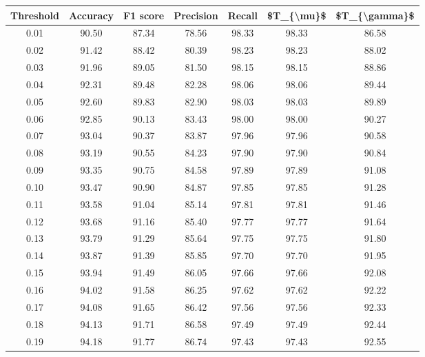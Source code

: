 \begin{tabular}{|c|c|c|c|c|c|c|}
\hline
 Threshold &  Accuracy &  F1 score &  Precision &  Recall &  \$T\_\{\textbackslash mu\}\$ &  \$T\_\{\textbackslash gamma\}\$ \\
\hline
      0.01 &     90.50 &     87.34 &      78.56 &   98.33 &      98.33 &         86.58 \\
      0.02 &     91.42 &     88.42 &      80.39 &   98.23 &      98.23 &         88.02 \\
      0.03 &     91.96 &     89.05 &      81.50 &   98.15 &      98.15 &         88.86 \\
      0.04 &     92.31 &     89.48 &      82.28 &   98.06 &      98.06 &         89.44 \\
      0.05 &     92.60 &     89.83 &      82.90 &   98.03 &      98.03 &         89.89 \\
      0.06 &     92.85 &     90.13 &      83.43 &   98.00 &      98.00 &         90.27 \\
      0.07 &     93.04 &     90.37 &      83.87 &   97.96 &      97.96 &         90.58 \\
      0.08 &     93.19 &     90.55 &      84.23 &   97.90 &      97.90 &         90.84 \\
      0.09 &     93.35 &     90.75 &      84.58 &   97.89 &      97.89 &         91.08 \\
      0.10 &     93.47 &     90.90 &      84.87 &   97.85 &      97.85 &         91.28 \\
      0.11 &     93.58 &     91.04 &      85.14 &   97.81 &      97.81 &         91.46 \\
      0.12 &     93.68 &     91.16 &      85.40 &   97.77 &      97.77 &         91.64 \\
      0.13 &     93.79 &     91.29 &      85.64 &   97.75 &      97.75 &         91.80 \\
      0.14 &     93.87 &     91.39 &      85.85 &   97.70 &      97.70 &         91.95 \\
      0.15 &     93.94 &     91.49 &      86.05 &   97.66 &      97.66 &         92.08 \\
      0.16 &     94.02 &     91.58 &      86.25 &   97.62 &      97.62 &         92.22 \\
      0.17 &     94.08 &     91.65 &      86.42 &   97.56 &      97.56 &         92.33 \\
      0.18 &     94.13 &     91.71 &      86.58 &   97.49 &      97.49 &         92.44 \\
      0.19 &     94.18 &     91.77 &      86.74 &   97.43 &      97.43 &         92.55 \\

\end{tabular}
